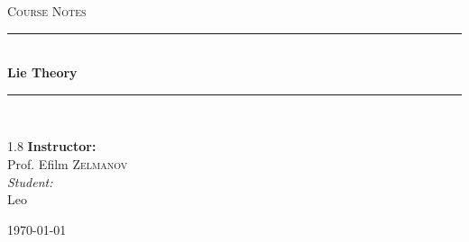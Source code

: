 \documentclass[11pt, a4paper]{report}
\newcommand{\HRule}[1]{\rule{\linewidth}{#1}}
\begin{document}
\begin{titlepage}
    \centering
    \vspace*{2cm}

    \textsc{\Large Course Notes}\\[0.5cm]

    \HRule{1.5pt} \\[0.5cm]
    { \huge \bfseries Lie Theory }\\[0.4cm]
    \HRule{1.5pt} \\[1.5cm]

    \vspace{3cm}

    \begin{spacing}{1.8}
        {\Large \textbf{Instructor:}} \\
        {\Large Prof. Efilm \textsc{Zelmanov}} \\[0.8cm]

        {\normalsize \textit{Student:}} \\
        {\normalsize Leo}
    \end{spacing}

    \vfill
    {\large \today}
\end{titlepage}
\newpage
\tableofcontents
\newpage

















\end{document}

